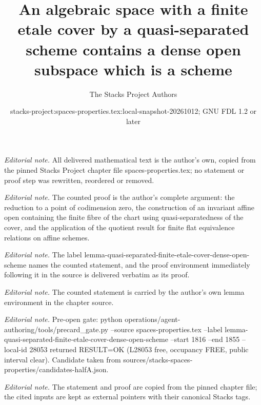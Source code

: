 \documentclass[10pt,a4paper]{amsart}
\title{An algebraic space with a finite etale cover by a quasi-separated scheme contains a dense open subspace which is a scheme}
\author{The Stacks Project Authors}
\date{stacks-project:spaces-properties.tex:local-snapshot-20261012; GNU FDL 1.2 or later}
\theoremstyle{plain}
\theoremstyle{definition}
\theoremstyle{remark}
\numberwithin{equation}{subsection}
\begin{document}
\maketitle
\noindent\textit{Editorial note.} All delivered mathematical text is the author's own, copied from the pinned Stacks Project chapter file spaces-properties.tex; no statement or proof step was rewritten, reordered or removed.\par\medskip
\noindent\textit{Editorial note.} The counted proof is the author's complete argument: the reduction to a point of codimension zero, the construction of an invariant affine open containing the finite fibre of the chart using quasi-separatedness of the cover, and the application of the quotient result for finite flat equivalence relations on affine schemes.\par\medskip
\noindent\textit{Editorial note.} The label lemma-quasi-separated-finite-etale-cover-dense-open-scheme names the counted statement, and the proof environment immediately following it in the source is delivered verbatim as its proof.\par\medskip
\noindent\textit{Editorial note.} The counted statement is carried by the author's own lemma environment in the chapter source.\par\medskip
\noindent\textit{Editorial note.} Pre-open gate: python operations/agent-authoring/tools/precard\_gate.py --source spaces-properties.tex --label lemma-quasi-separated-finite-etale-cover-dense-open-scheme --start 1816 --end 1855 --local-id 28053 returned RESULT=OK (L28053 free, occupancy FREE, public interval clear). Candidate taken from sources/stacks-spaces-properties/candidates-halfA.json.\par\medskip
\noindent\textit{Editorial note.} The statement and proof are copied from the pinned chapter file; the cited inputs are kept as external pointers with their canonical Stacks tags.\par\medskip
\end{document}
